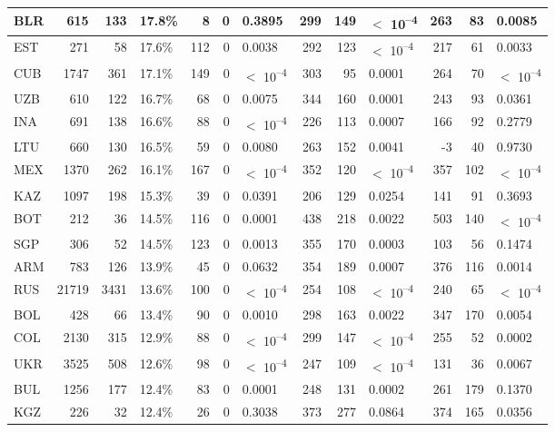 \begin{tabular}{l|r|r|l|r|r|l|r|r|l|r|r|l}
\hline
BLR & 615 & 133 & 17.8\% & 8 & 0 & 0.3895 & 299 & 149 & $<$ 10\textsuperscript{--4} & 263 & 83 & 0.0085\\
\hline
EST & 271 & 58 & 17.6\% & 112 & 0 & 0.0038 & 292 & 123 & $<$ 10\textsuperscript{--4} & 217 & 61 & 0.0033\\
\hline
CUB & 1747 & 361 & 17.1\% & 149 & 0 & $<$ 10\textsuperscript{--4} & 303 & 95 & 0.0001 & 264 & 70 & $<$ 10\textsuperscript{--4}\\
\hline
UZB & 610 & 122 & 16.7\% & 68 & 0 & 0.0075 & 344 & 160 & 0.0001 & 243 & 93 & 0.0361\\
\hline
INA & 691 & 138 & 16.6\% & 88 & 0 & $<$ 10\textsuperscript{--4} & 226 & 113 & 0.0007 & 166 & 92 & 0.2779\\
\hline
LTU & 660 & 130 & 16.5\% & 59 & 0 & 0.0080 & 263 & 152 & 0.0041 & -3 & 40 & 0.9730\\
\hline
MEX & 1370 & 262 & 16.1\% & 167 & 0 & $<$ 10\textsuperscript{--4} & 352 & 120 & $<$ 10\textsuperscript{--4} & 357 & 102 & $<$ 10\textsuperscript{--4}\\
\hline
KAZ & 1097 & 198 & 15.3\% & 39 & 0 & 0.0391 & 206 & 129 & 0.0254 & 141 & 91 & 0.3693\\
\hline
BOT & 212 & 36 & 14.5\% & 116 & 0 & 0.0001 & 438 & 218 & 0.0022 & 503 & 140 & $<$ 10\textsuperscript{--4}\\
\hline
SGP & 306 & 52 & 14.5\% & 123 & 0 & 0.0013 & 355 & 170 & 0.0003 & 103 & 56 & 0.1474\\
\hline
ARM & 783 & 126 & 13.9\% & 45 & 0 & 0.0632 & 354 & 189 & 0.0007 & 376 & 116 & 0.0014\\
\hline
RUS & 21719 & 3431 & 13.6\% & 100 & 0 & $<$ 10\textsuperscript{--4} & 254 & 108 & $<$ 10\textsuperscript{--4} & 240 & 65 & $<$ 10\textsuperscript{--4}\\
\hline
BOL & 428 & 66 & 13.4\% & 90 & 0 & 0.0010 & 298 & 163 & 0.0022 & 347 & 170 & 0.0054\\
\hline
COL & 2130 & 315 & 12.9\% & 88 & 0 & $<$ 10\textsuperscript{--4} & 299 & 147 & $<$ 10\textsuperscript{--4} & 255 & 52 & 0.0002\\
\hline
UKR & 3525 & 508 & 12.6\% & 98 & 0 & $<$ 10\textsuperscript{--4} & 247 & 109 & $<$ 10\textsuperscript{--4} & 131 & 36 & 0.0067\\
\hline
BUL & 1256 & 177 & 12.4\% & 83 & 0 & 0.0001 & 248 & 131 & 0.0002 & 261 & 179 & 0.1370\\
\hline
KGZ & 226 & 32 & 12.4\% & 26 & 0 & 0.3038 & 373 & 277 & 0.0864 & 374 & 165 & 0.0356\\

\end{tabular}
